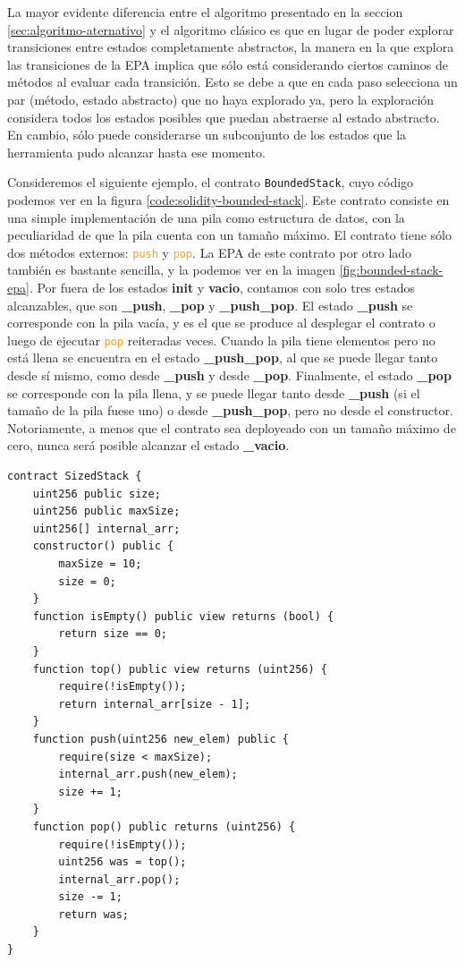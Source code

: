 La mayor evidente diferencia entre el algoritmo presentado en la seccion \ref{sec:algoritmo-aternativo} y el algoritmo clásico es que en lugar de poder explorar transiciones entre estados completamente abstractos, la manera en la que explora las transiciones de la EPA implica que sólo está considerando ciertos caminos de métodos al evaluar cada transición.
Esto se debe a que en cada paso selecciona un par (método, estado abstracto) que no haya explorado ya, pero la exploración considera todos los estados posibles que puedan abstraerse al estado abstracto.
En cambio, sólo puede considerarse un subconjunto de los estados que la herramienta pudo alcanzar hasta ese momento.

Consideremos el siguiente ejemplo, el contrato \texttt{BoundedStack}, cuyo código podemos ver en la figura \ref{code:solidity-bounded-stack}.
Este contrato consiste en una simple implementación de una pila como estructura de datos, con la peculiaridad de que la pila cuenta con un tamaño máximo.
El contrato tiene sólo dos métodos externos: \textcolor{orange}{\texttt{push}} y \textcolor{orange}{\texttt{pop}}.
La EPA de este contrato por otro lado también es bastante sencilla, y la podemos ver en la imagen \ref{fig:bounded-stack-epa}.
Por fuera de los estados \textbf{init} y \textbf{vacio}, contamos con solo tres estados alcanzables, que son \textbf{\_push}, \textbf{\_pop} y \textbf{\_push\_pop}.
El estado \textbf{\_push} se corresponde con la pila vacía, y es el que se produce al desplegar el contrato o luego de ejecutar \textcolor{orange}{\texttt{pop}} reiteradas veces.
Cuando la pila tiene elementos pero no está llena se encuentra en el estado \textbf{\_push\_pop}, al que se puede llegar tanto desde sí mismo, como desde \textbf{\_push} y desde \textbf{\_pop}.
Finalmente, el estado \textbf{\_pop} se corresponde con la pila llena, y se puede llegar tanto desde \textbf{\_push} (si el tamaño de la pila fuese uno) o desde \textbf{\_push\_pop}, pero no desde el constructor.
Notoriamente, a menos que el contrato sea deployeado con un tamaño máximo de cero, nunca será posible alcanzar el estado \textbf{\_vacio}.

\begin{lstlisting}[language=Solidity, label={code:solidity-bounded-stack}, caption={Contrato Inteligente \texttt{BoundedStack} en Solidity},captionpos=b]
contract SizedStack {
    uint256 public size;
    uint256 public maxSize;
    uint256[] internal_arr;
    constructor() public {
        maxSize = 10;
        size = 0;
    }
    function isEmpty() public view returns (bool) {
        return size == 0;
    }
    function top() public view returns (uint256) {
        require(!isEmpty());
        return internal_arr[size - 1];
    }
    function push(uint256 new_elem) public {
        require(size < maxSize);
        internal_arr.push(new_elem);
        size += 1;
    }
    function pop() public returns (uint256) {
        require(!isEmpty());
        uint256 was = top();
        internal_arr.pop();
        size -= 1;
        return was;
    }
}
\end{lstlisting}


